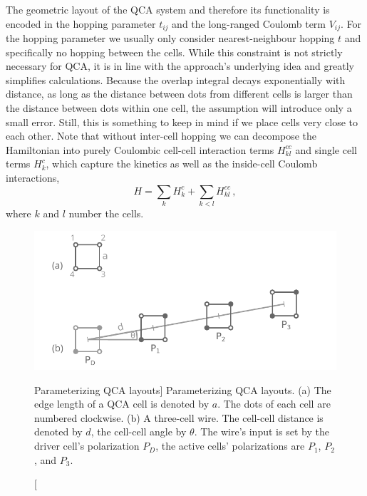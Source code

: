 The geometric layout of the QCA system and therefore its functionality is
encoded in the hopping parameter $t_{ij}$ and the long-ranged Coulomb term
$V_{ij}$. For the hopping parameter we usually only consider nearest-neighbour
hopping $t$ and specifically no hopping between the cells. While this constraint
is not strictly necessary for QCA, it is in line with the approach's underlying
idea and greatly simplifies calculations. Because the overlap integral decays
exponentially with distance, as long as the distance between dots from different
cells is larger than the distance between dots within one cell, the assumption
will introduce only a small error. Still, this is something to keep in mind if
we place cells very close to each other. Note that without inter-cell hopping we
can decompose the Hamiltonian into purely Coulombic cell-cell interaction terms
$H^{cc}_{kl}$ and single cell terms $H^c_k$, which capture the kinetics as well
as the inside-cell Coulomb interactions,
\begin{equation}
  \label{eq:H_cell}
  H = \sum_k H^c_k + \sum_{k<l} H^{cc}_{kl} \, ,
\end{equation}
where $k$ and $l$ number the cells. 

\begin{figure}
  \center
  \includegraphics{short_wire}
  \caption
  [Parameterizing QCA layouts]
  {Parameterizing QCA layouts. (a) The edge length of a QCA cell is
  denoted by $a$. The dots of each cell are numbered clockwise. (b) A
  three-cell wire. The cell-cell distance is denoted by $d$, the cell-cell angle
  by $\theta$. The wire's input is set by the driver cell's polarization $P_D$,
  the active cells' polarizations are $P_1$, $P_2$, and $P_3$.}
  \label{fig:short_wire}
\end{figure}

